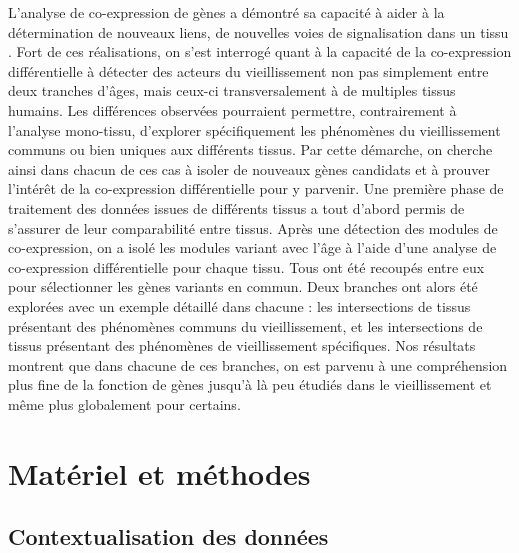L'analyse de co-expression de gènes a démontré sa capacité à aider à la détermination de nouveaux liens, de nouvelles voies de signalisation dans un tissu . 
Fort de ces réalisations, on s'est interrogé quant à la capacité de la co-expression différentielle à détecter des acteurs du vieillissement non pas simplement entre deux tranches d'âges, mais ceux-ci transversalement à de multiples tissus humains. 
Les différences observées pourraient permettre, contrairement à l'analyse mono-tissu, d'explorer spécifiquement les phénomènes du vieillissement communs ou bien uniques aux différents tissus. 
Par cette démarche, on cherche ainsi dans chacun de ces cas à isoler de nouveaux gènes candidats et à prouver l'intérêt de la co-expression différentielle pour y parvenir.
Une première phase de traitement des données issues de différents tissus a tout d'abord permis de s'assurer de leur comparabilité entre tissus. 
Après une détection des modules de co-expression, on a isolé les modules variant avec l'âge à l'aide d'une analyse de co-expression différentielle pour chaque tissu. Tous ont été recoupés entre eux pour sélectionner les gènes variants en commun. Deux branches ont alors été explorées avec un exemple détaillé dans chacune : les intersections de tissus présentant des phénomènes communs du vieillissement, et les intersections de tissus présentant des phénomènes de vieillissement spécifiques. 
Nos résultats montrent que dans chacune de ces branches, on est parvenu à une compréhension plus fine de la fonction de gènes jusqu'à là peu étudiés dans le vieillissement et même plus globalement pour certains.




\section{Matériel et méthodes}

\subsection{Contextualisation des données}

